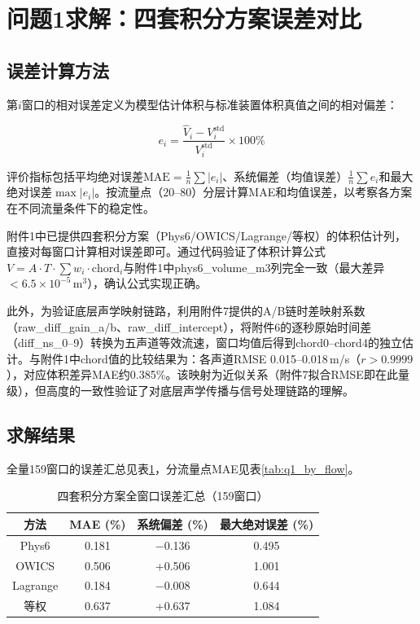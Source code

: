 \section{问题1求解：四套积分方案误差对比}

\subsection{误差计算方法}

第$i$窗口的相对误差定义为模型估计体积与标准装置体积真值之间的相对偏差：

\begin{equation}
e_i = \frac{\hat{V}_i - V_i^{\text{std}}}{V_i^{\text{std}}} \times 100\%
\label{eq:error_def}
\end{equation}

评价指标包括平均绝对误差$\text{MAE} = \frac{1}{n}\sum|e_i|$、系统偏差（均值误差）$\frac{1}{n}\sum e_i$和最大绝对误差$\max|e_i|$。按流量点（20--80）分层计算MAE和均值误差，以考察各方案在不同流量条件下的稳定性。

附件1中已提供四套积分方案（Phys6/OWICS/Lagrange/等权）的体积估计列，直接对每窗口计算相对误差即可。通过代码验证了体积计算公式$V = A \cdot T \cdot \sum w_i \cdot \text{chord}_i$与附件1中phys6\_volume\_m3列完全一致（最大差异$<6.5\times10^{-5}$\,m$^3$），确认公式实现正确。

此外，为验证底层声学映射链路，利用附件7提供的A/B链时差映射系数（raw\_diff\_gain\_a/b、raw\_diff\_intercept），将附件6的逐秒原始时间差（diff\_ns\_0--9）转换为五声道等效流速，窗口均值后得到chord0--chord4的独立估计。与附件1中chord值的比较结果为：各声道RMSE 0.015--0.018\,m/s（$r > 0.9999$），对应体积差异MAE约0.385\%。该映射为近似关系（附件7拟合RMSE即在此量级），但高度的一致性验证了对底层声学传播与信号处理链路的理解。

\subsection{求解结果}

全量159窗口的误差汇总见表\ref{tab:q1_summary}，分流量点MAE见表\ref{tab:q1_by_flow}。

\begin{table}[H]
\centering
\caption{四套积分方案全窗口误差汇总（159窗口）}
\label{tab:q1_summary}
\begin{tabular}{cccc}
\toprule
方法 & MAE (\%) & 系统偏差 (\%) & 最大绝对误差 (\%) \\
\midrule
Phys6 & 0.181 & $-$0.136 & 0.495 \\
OWICS & 0.506 & +0.506 & 1.001 \\
Lagrange & 0.184 & $-$0.008 & 0.644 \\
等权 & 0.637 & +0.637 & 1.084 \\
\bottomrule
\end{tabular}
\end{table}

